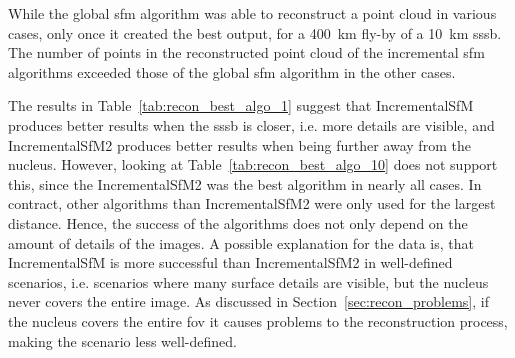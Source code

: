 \begin{table}[htb]
    \centering
    \caption{\Gls{sfm} algorithm with most reconstructed points for each scenario with a \SI{10}{\kilo\meter} \gls{sssb}. Seq1 refers to algorithm IncrementalSfM, Seq2 refers to algorithm IncrementalSfM2 and Glob refers to algorithm GlobalSfM.}
    \label{tab:recon_best_algo_10}
\end{table}


While the global \gls{sfm} algorithm was able to reconstruct a point cloud in various cases, only once it created the best output, for a \SI{400}{\kilo\meter} fly-by of a \SI{10}{\kilo\meter} \gls{sssb}. The number of points in the reconstructed point cloud of the incremental \gls{sfm} algorithms exceeded those of the global \gls{sfm} algorithm in the other cases.

The results in Table~\ref{tab:recon_best_algo_1} suggest that IncrementalSfM produces better results when the \gls{sssb} is closer, i.e. more details are visible, and IncrementalSfM2 produces better results when being further away from the nucleus. However, looking at Table~\ref{tab:recon_best_algo_10} does not support this, since the IncrementalSfM2 was the best algorithm in nearly all cases. In contract, other algorithms than IncrementalSfM2 were only used for the largest distance. Hence, the success of the algorithms does not only depend on the amount of details of the images. A possible explanation for the data is, that IncrementalSfM is more successful than IncrementalSfM2 in well-defined scenarios, i.e. scenarios where many surface details are visible, but the nucleus never covers the entire image. As discussed in Section~\ref{sec:recon_problems}, if the nucleus covers the entire \gls{fov} it causes problems to the reconstruction process, making the scenario less well-defined.

